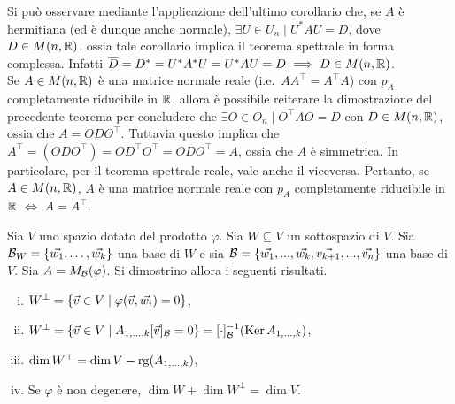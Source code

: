 \begin{remark}\nl
	\li Si può osservare mediante l'applicazione dell'ultimo corollario che, se $A$ è hermitiana (ed è dunque
	anche normale),
	$\exists U \in U_n \mid U^* A U = D$, dove $D \in M(n, \mathbb R)$, ossia tale
	corollario implica il teorema spettrale in forma complessa. Infatti
	$\overline{D} = D^* = U^* A^* U = U^* A U = D \implies D \in M(n, \mathbb R)$. \\
	
	\li Se $A \in M(n, \mathbb R)$ è una matrice normale reale (i.e.~$A A^\top = A^\top A$) con
	$p_A$ completamente riducibile in $\mathbb R$, allora è possibile reiterare la dimostrazione
	del precedente teorema per concludere che $\exists O \in O_n \mid O^\top A O = D$ con
	$D \in M(n, \mathbb R)$, ossia che $A = O D O^\top$.
	Tuttavia questo implica che $A^\top = (O D O^\top) = O D^\top O^\top = O D O^\top = A$,
	ossia che $A$ è simmetrica. In particolare, per il teorema spettrale reale, vale
	anche il viceversa. Pertanto, se $A \in M(n, \mathbb R)$, $A$ è una matrice normale reale con $p_A$ completamente
	riducibile in $\mathbb R$ $\iff$ $A = A^\top$.
\end{remark}

\begin{exercise}
	Sia $V$ uno spazio dotato del prodotto $\varphi$. Sia
	$W \subseteq V$ un sottospazio di $V$. Sia $\basis_W= \{ \ww 1, \ldots, \ww k \}$
	una base di $W$ e sia $\basis = \{ \ww 1, ..., \ww k, \vv{k+1}, ..., \vv n \}$ una base di $V$.
	Sia $A = M_{\mathcal{B}}(\varphi)$. Si dimostrino allora i seguenti risultati.
	
	\begin{enumerate}[(i)]
		\item $W^\perp = \{ \v \in V \mid \varphi(\v, \ww i) = 0 \}$,
		\item $W^\perp = \{ \v \in V \mid A_{1,\ldots,k} [\v]_\basis = 0 \} = [\cdot]_\basis\inv (\Ker A_{1,\ldots,k})$,
		\item $\dim W^\top = \dim V - \operatorname{rg}(A_{1,\ldots,k})$,
		\item Se $\varphi$ è non degenere, $\dim W + \dim W^\perp = \dim V$.
	\end{enumerate}
\end{exercise}

